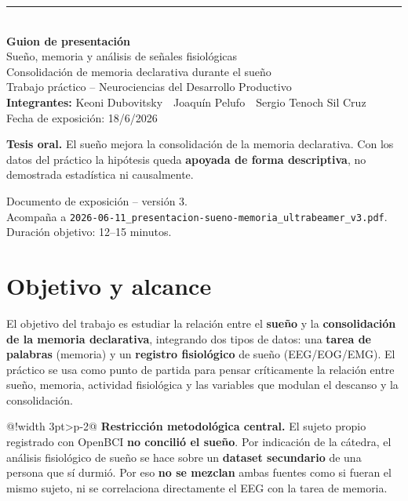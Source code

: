 \documentclass[11pt,a4paper]{article}
\makeatletter
\newcommand{\cajaW}{\dimexpr\linewidth-3pt-2\tabcolsep-1pt\relax}
\newenvironment{avisobox}{%
  \par\smallskip\noindent
  \begin{tabular}{@{}!{\color{warn}\vrule width 3pt}>{\columncolor{warn!8}\color{ink}}p{\cajaW}@{}}}%
  {\end{tabular}\par\smallskip}
\makeatother
\begin{document}
\thispagestyle{empty}
\begin{center}
  \vspace*{2.0cm}
  {\color{amber}\rule{4cm}{2pt}}\\[10pt]
  {\Huge\bfseries\color{navy} Guion de presentación}\\[10pt]
  {\LARGE\color{ink} Sueño, memoria y análisis de señales fisiológicas}\\[8pt]
  {\large\color{muted} Consolidación de memoria declarativa durante el sueño}\\[24pt]
  {\large Trabajo práctico -- Neurociencias del Desarrollo Productivo}\\[10pt]
  {\large\textbf{Integrantes:} Keoni Dubovitsky \,\textbullet\, Joaquín Pelufo \,\textbullet\, Sergio Tenoch Sil Cruz}\\[6pt]
  {\large\color{muted} Fecha de exposición: 18/6/2026}\\[20pt]
  \colorbox{navy!6}{\parbox{0.80\textwidth}{\medskip\centering\normalsize
    \textbf{Tesis oral.} El sueño mejora la consolidación de la memoria declarativa.
    Con los datos del práctico la hipótesis queda \textbf{apoyada de forma descriptiva},
    no demostrada estadística ni causalmente.\medskip}}
  \vfill
  {\small\color{muted} Documento de exposición -- versión 3.\\
   Acompaña a \texttt{2026-06-11\_presentacion-sueno-memoria\_ultrabeamer\_v3.pdf}.
   Duración objetivo: 12--15 minutos.}
\end{center}
\newpage

\tableofcontents
\newpage

\section{Objetivo y alcance}
El objetivo del trabajo es estudiar la relación entre el \textbf{sueño} y la
\textbf{consolidación de la memoria declarativa}, integrando dos tipos de datos: una
\textbf{tarea de palabras} (memoria) y un \textbf{registro fisiológico} de sueño
(EEG/EOG/EMG). El práctico se usa como punto de partida para pensar críticamente la
relación entre sueño, memoria, actividad fisiológica y las variables que modulan el
descanso y la consolidación.

\begin{avisobox}
\textbf{Restricción metodológica central.} El sujeto propio registrado con OpenBCI
\textbf{no concilió el sueño}. Por indicación de la cátedra, el análisis fisiológico de
sueño se hace sobre un \textbf{dataset secundario} de una persona que sí durmió. Por eso
\textbf{no se mezclan} ambas fuentes como si fueran el mismo sujeto, ni se correlaciona
directamente el EEG con la tarea de memoria.
\end{avisobox}
\end{document}
